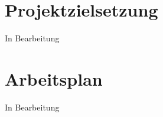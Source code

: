 \documentclass[12pt,a4paper, oneside]{scrartcl}
\begin{document}



\newpage




\section{Projektzielsetzung}
	In Bearbeitung 
	






\newpage




\section{Arbeitsplan}
	In Bearbeitung





\newpage





\end{document}
